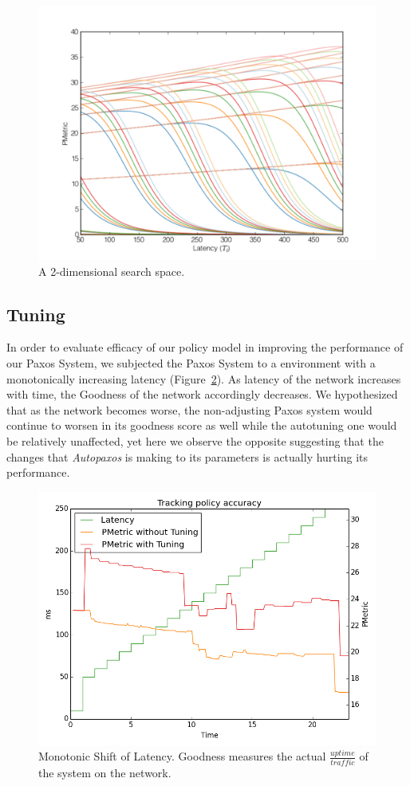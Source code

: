 \begin{figure}[htbp]
\begin{center}
\includegraphics[width=\columnwidth]{search_space_final}
\caption{A 2-dimensional search space.}
\label{search_space}
\end{center}
\end{figure}

\subsection{Tuning}
In order to evaluate efficacy of our policy model in improving the performance of our Paxos System, we subjected the Paxos System to a environment with a monotonically increasing latency (Figure~\ref{monotonic_shift}).  As latency of the network increases with time, the Goodness of the network accordingly decreases.  We hypothesized that as the network becomes worse, the non-adjusting Paxos system would continue to worsen in its goodness score as well while the autotuning one would be relatively unaffected, yet here we observe the opposite suggesting that the changes that \emph{Autopaxos} is making to its parameters is actually hurting its performance. 

\begin{figure}[htbp]
\begin{center}
\includegraphics[width=\columnwidth]{monotonic_shift}
\caption{Monotonic Shift of Latency.  Goodness measures the actual $\frac{uptime}{traffic}$ of the system on the network.}
\label{monotonic_shift}
\end{center}
\end{figure}